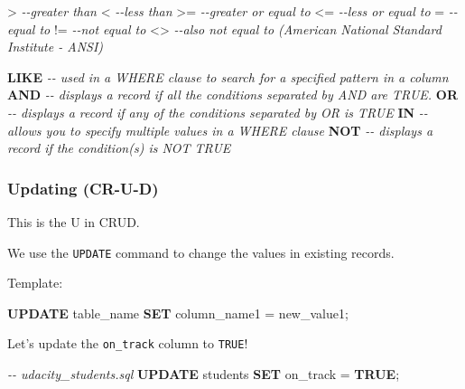 \documentclass[11pt]{article}
\newenvironment{Shaded}{}{}
\newcommand{\KeywordTok}[1]{\textcolor[rgb]{0.00,0.44,0.13}{\textbf{{#1}}}}
\newcommand{\CommentTok}[1]{\textcolor[rgb]{0.38,0.63,0.69}{\textit{{#1}}}}
\newcommand{\NormalTok}[1]{{#1}}
\newcommand{\OperatorTok}[1]{\textcolor[rgb]{0.40,0.40,0.40}{{#1}}}
\begin{document}
\begin{Shaded}
\begin{Highlighting}[]
\OperatorTok{\textgreater{}} \CommentTok{{-}{-}greater than}
\OperatorTok{\textless{}} \CommentTok{{-}{-}less than}
\OperatorTok{\textgreater{}=} \CommentTok{{-}{-}greater or equal to}
\OperatorTok{\textless{}=} \CommentTok{{-}{-}less or equal to}
\OperatorTok{=} \CommentTok{{-}{-}equal to}
\OperatorTok{!=} \CommentTok{{-}{-}not equal to}
\OperatorTok{\textless{}\textgreater{}} \CommentTok{{-}{-}also not equal to (American National Standard Institute {-} ANSI)}
 
\KeywordTok{LIKE} \CommentTok{{-}{-} used in a WHERE clause to search for a specified pattern in a column}
\KeywordTok{AND} \CommentTok{{-}{-} displays a record if all the conditions separated by AND are TRUE.}
\KeywordTok{OR} \CommentTok{{-}{-} displays a record if any of the conditions separated by OR is TRUE}
\KeywordTok{IN} \CommentTok{{-}{-}  allows you to specify multiple values in a WHERE clause}
\KeywordTok{NOT} \CommentTok{{-}{-} displays a record if the condition(s) is NOT TRUE}
\end{Highlighting}
\end{Shaded}

    \hypertarget{updating-cr-u-d}{%
\subsubsection{\texorpdfstring{Updating
(CR-\textbf{U}-D)}{Updating (CR-U-D)}}\label{updating-cr-u-d}}

This is the U in CRUD.

We use the \texttt{UPDATE} command to change the values in existing
records.

Template:

\begin{Shaded}
\begin{Highlighting}[]
\KeywordTok{UPDATE}\NormalTok{ table\_name }\KeywordTok{SET}\NormalTok{ column\_name1 }\OperatorTok{=}\NormalTok{ new\_value1;}
\end{Highlighting}
\end{Shaded}

Let's update the \texttt{on\_track} column to \texttt{TRUE}!

\begin{Shaded}
\begin{Highlighting}[]
\CommentTok{{-}{-} udacity\_students.sql}
\KeywordTok{UPDATE}\NormalTok{ students }\KeywordTok{SET}\NormalTok{ on\_track }\OperatorTok{=} \KeywordTok{TRUE}\NormalTok{;}
\end{Highlighting}
\end{Shaded}
\end{document}
